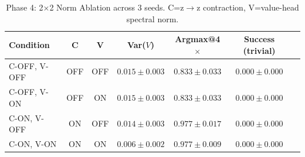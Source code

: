 \begin{table}[t]
\centering
\caption{Phase 4: 2×2 Norm Ablation across 3 seeds. C=z$\to$z contraction, V=value-head spectral norm.}
\label{tab:phase4-2x2-ablation}
\begin{tabular}{lcccccc}
\toprule
Condition & C & V & Var($V$) & Argmax@4$\times$ & Success (trivial) \\
\midrule
C-OFF, V-OFF & OFF & OFF & $0.015 \pm 0.003$ & $0.833 \pm 0.033$ & $0.000 \pm 0.000$ \\
C-OFF, V-ON & OFF & ON & $0.015 \pm 0.003$ & $0.833 \pm 0.033$ & $0.000 \pm 0.000$ \\
C-ON, V-OFF & ON & OFF & $0.014 \pm 0.003$ & $0.977 \pm 0.017$ & $0.000 \pm 0.000$ \\
C-ON, V-ON & ON & ON & $0.006 \pm 0.002$ & $0.977 \pm 0.009$ & $0.000 \pm 0.000$ \\
\bottomrule
\end{tabular}
\end{table}
